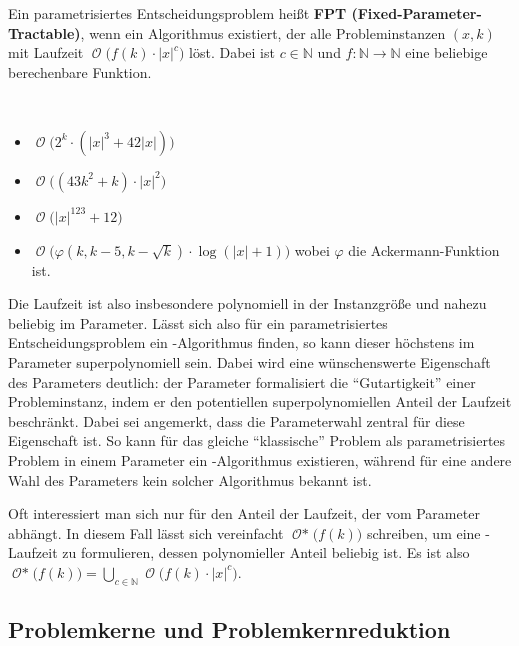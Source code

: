 \documentclass[a4paper,ngerman]{atseminar}
\newcommand{\N}{\ensuremath{\mathbb{N}}\xspace}
\newcommand{\BigO}[1]{\ensuremath{\operatorname{\mathcal{O}}\bigl(#1\bigr)}\xspace}
\newcommand{\BigOStar}[1]{\ensuremath{\operatorname{\mathcal{O*}}\bigl(#1\bigr)}\xspace}
\begin{document}
\begin{definition}
  \label{OE:def:fpt}
  Ein parametrisiertes Entscheidungsproblem heißt \textbf{FPT (Fixed-Parameter-Tractable)}, wenn ein Algorithmus existiert,
  der alle Probleminstanzen $(x, k)$ mit Laufzeit \BigO{f(k) \cdot |x|^c} löst.
  Dabei ist $c \in \N$ und $f: \N \rightarrow \N$ eine beliebige berechenbare Funktion.
\end{definition}

\begin{example}
  $ $
  \begin{itemize}
    \item \BigO{2^k \cdot (|x|^3+42|x|)}
    \item \BigO{(43k^2+k) \cdot {|x|^2}}
    \item \BigO{|x|^{123}+12}
    \item \BigO{\varphi(k, k - 5, k - \sqrt{k}) \cdot \log(|x| + 1)} wobei $\varphi$ die Ackermann-Funktion ist.
  \end{itemize}
\end{example}

\noindent
Die Laufzeit ist also insbesondere polynomiell in der Instanzgröße und nahezu beliebig im Parameter.
Lässt sich also für ein parametrisiertes Entscheidungsproblem ein \FPT-Algorithmus finden, so kann dieser höchstens im Parameter superpolynomiell sein.
Dabei wird eine wünschenswerte Eigenschaft des Parameters deutlich: der Parameter formalisiert die \enquote{Gutartigkeit} einer Probleminstanz, indem er den potentiellen superpolynomiellen
Anteil der Laufzeit beschränkt. Dabei sei angemerkt, dass die Parameterwahl zentral für diese Eigenschaft ist.
So kann für das gleiche \enquote{klassische} Problem als parametrisiertes Problem in einem Parameter ein \FPT-Algorithmus existieren, während für eine andere Wahl
des Parameters kein solcher Algorithmus bekannt ist.

\noindent
Oft interessiert man sich nur für den Anteil der Laufzeit, der vom Parameter abhängt. In diesem Fall lässt sich vereinfacht
$\BigOStar{f(k)}$ schreiben, um eine \FPT-Laufzeit zu formulieren, dessen polynomieller Anteil beliebig ist.
Es ist also $\BigOStar{f(k)} = \bigcup_{c \in \N} \BigO{f(k) \cdot |x|^c}$.

\subsection{Problemkerne und Problemkernreduktion}
\label{OE:sec:kernel}
\end{document}
